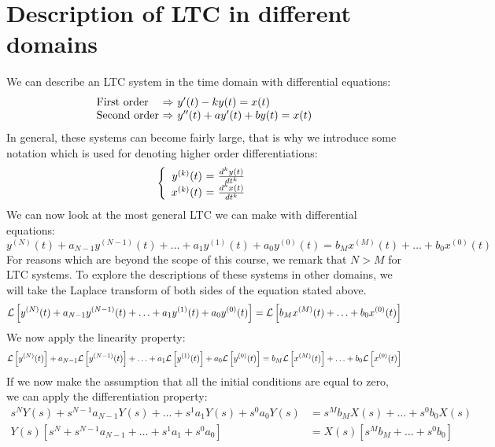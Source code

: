 \documentclass[]{subfiles}
\begin{document}
	\section{Description of LTC in different domains}
	We can describe an LTC system  in the time domain with differential equations:
	\begin{equation}
		 \begin{array}{l@{\text{ $\Rightarrow$ }}l}
			\text{First order}& y'(t)-ky(t)=x(t)\\
			\text{Second order}&y''(t)+ay'(t)+by(t)=x(t)
		\end{array}
	\end{equation}
	In general, these systems can become fairly large, that is why we introduce some notation which is used for denoting higher order differentiations: 
	\begin{equation}
		\left\{ \begin{array}{r@{\text{ $=$ }}l}
			y^{(k)}(t)& \frac{d^ky(t)}{dt^k} \\
			x^{(k)}(t)& \frac{d^kx(t)}{dt^k}
		\end{array}\right.
	\end{equation}
	We can now look at the most general LTC we can make with differential equations:
	\begin{equation}
		y^{(N)}(t)+a_{N-1}y^{(N-1)}(t)+\ldots+a_1y^{(1)}(t)+a_0y^{(0)}(t)=b_Mx^{(M)}(t)+\ldots+b_0x^{(0)}(t)
	\end{equation}
	For reasons which are beyond the scope of this course, we remark that $N > M$ for LTC systems. To explore the descriptions of these systems in other domains, we will take the Laplace transform of both sides of the equation stated above.
	\begin{equation}
		\mathcal{L} \left[ y^{(N)}(t)+a_{N-1}y^{(N-1)}(t)+\ldots+a_1y^{(1)}(t)+a_0y^{(0)}(t)\right]  =\mathcal{L} \left[ b_Mx^{(M)}(t)+\ldots+b_0x^{(0)}(t)\right] 
	\end{equation}
	We now apply the linearity property:
	\begin{equation}
		\mathcal{L} \left[ y^{(N)}(t)\right] +a_{N-1}\mathcal{L}\left[ y^{(N-1)}(t)\right] +\ldots+a_1\mathcal{L}\left[ y^{(1)}(t)\right] +a_0\mathcal{L}\left[ y^{(0)}(t)\right]  =b_M\mathcal{L} \left[ x^{(M)}(t)\right] +\ldots+b_0\mathcal{L}\left[ x^{(0)}(t)\right] 
	\end{equation}
	If we now make the assumption that all the initial conditions are equal to zero, we can apply the differentiation property:
	\begin{align}
		s^NY(s)+s^{N-1}a_{N-1}Y(s)+\ldots+s^1a_1Y(s)+s^0a_0Y(s)&=s^Mb_MX(s)+\ldots+s^0b_0X(s)\\
		Y(s)\left[ s^N+s^{N-1}a_{N-1}+\ldots+s^1a_1+s^0a_0\right] &=X(s)\left[ s^Mb_M+\ldots+s^0b_0\right] 
	\end{align}
\end{document}
